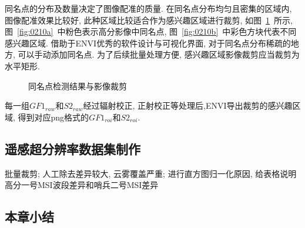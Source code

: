 同名点的分布及数量决定了图像配准的质量. 在同名点分布均匀且密集的区域内, 图像配准效果比较好, 此种区域比较适合作为感兴趣区域进行裁剪, 如图~\ref{fig:0210}~所示, 图~\ref{fig:0210a}~中粉色表示高分影像中同名点, 图~\ref{fig:0210b}~中彩色方块代表不同感兴趣区域. 借助于ENVI优秀的软件设计与可视化界面, 对于同名点分布稀疏的地方, 可以手动添加同名点. 为了后续批量处理方便, 感兴趣区域影像裁剪应当裁剪为水平矩形. 

\begin{figure}[!htbp]
    \centering
    \quad
    \caption{同名点检测结果与影像裁剪}
    \label{fig:0210}
\end{figure}

每一组$GF1_{raw}$和$S2_{raw}$经过辐射校正, 正射校正等处理后,ENVI导出裁剪的感兴趣区域, 得到对应png格式的$GF1_{roi}$和$S2_{roi}$. 

\subsection{遥感超分辨率数据集制作}
批量裁剪; 人工除去差异较大, 云雾覆盖严重; 进行直方图归一化原因, 给表格说明高分一号MSI波段差异和哨兵二号MSI差异

\subsection{本章小结}
